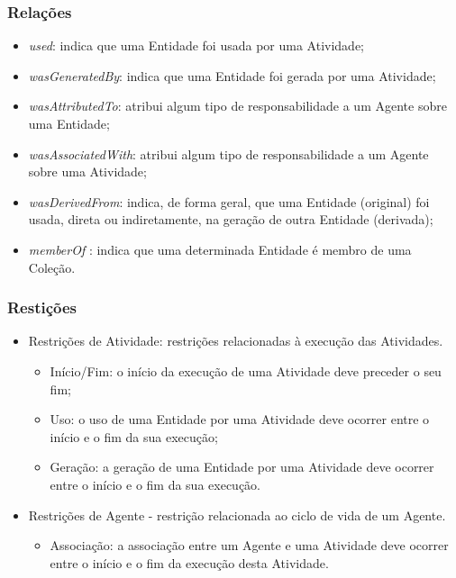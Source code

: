 \documentclass{beamer}
\begin{document}
\begin{frame}
\frametitle{Rela\c{c}\~oes}
\begin{itemize}
\item \textit{used}: indica que uma Entidade foi usada por uma Atividade;
\item \textit{wasGeneratedBy}: indica que uma Entidade foi gerada por uma Atividade;
\item \textit{wasAttributedTo}: atribui algum tipo de responsabilidade a um Agente sobre uma Entidade;
\item \textit{wasAssociatedWith}: atribui algum tipo de responsabilidade a um
  Agente sobre uma Atividade;
\item \textit{wasDerivedFrom}: indica, de forma geral, que uma Entidade
  (original) foi usada, direta ou indiretamente, na gera\c{c}\~ao de
  outra Entidade (derivada);
\item \textit{memberOf} : indica que uma determinada Entidade \'e membro de uma Cole\c{c}\~ao.
\end{itemize}
\end{frame}

\begin{frame}
\frametitle{Resti\c{c}\~oes}
\begin{itemize}
\item Restri\c{c}\~oes de Atividade: restri\c{c}\~oes relacionadas \`a
  execu\c{c}\~ao das Atividades.
\begin{itemize}
\item In\'icio/Fim: o in\'icio da execu\c{c}\~ao de uma Atividade deve
  preceder o seu fim;
\item Uso: o uso de uma Entidade por uma Atividade deve ocorrer entre o in\'icio e o
fim da sua execu\c{c}\~ao;
\item Gera\c{c}\~ao: a gera\c{c}\~ao de uma Entidade por uma Atividade deve ocorrer entre o in\'icio e o fim da sua execu\c{c}\~ao.
\end{itemize}
\item Restri\c{c}\~oes de Agente - restri\c{c}\~ao relacionada ao
  ciclo de vida de um Agente.
\begin{itemize}
\item Associa\c{c}\~ao: a associa\c{c}\~ao entre um Agente e uma Atividade deve ocorrer entre
o in\'icio e o fim da execu\c{c}\~ao desta Atividade.
\end{itemize}
\end{itemize}
\end{frame}
\end{document}
